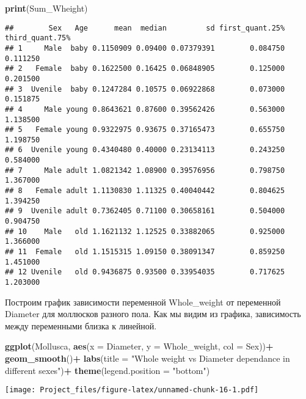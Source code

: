 \documentclass[]{article}
\newenvironment{Shaded}{\begin{snugshade}}{\end{snugshade}}
\newcommand{\DataTypeTok}[1]{\textcolor[rgb]{0.13,0.29,0.53}{#1}}
\newcommand{\KeywordTok}[1]{\textcolor[rgb]{0.13,0.29,0.53}{\textbf{#1}}}
\newcommand{\NormalTok}[1]{#1}
\newcommand{\OperatorTok}[1]{\textcolor[rgb]{0.81,0.36,0.00}{\textbf{#1}}}
\newcommand{\StringTok}[1]{\textcolor[rgb]{0.31,0.60,0.02}{#1}}
\begin{document}
\begin{Shaded}
\begin{Highlighting}[]
\KeywordTok{print}\NormalTok{(Sum_Wheight)}
\end{Highlighting}
\end{Shaded}

\begin{verbatim}
##        Sex   Age      mean  median         sd first_quant.25% third_quant.75%
## 1     Male  baby 0.1150909 0.09400 0.07379391        0.084750        0.111250
## 2   Female  baby 0.1622500 0.16425 0.06848905        0.125000        0.201500
## 3  Uvenile  baby 0.1247284 0.10575 0.06922868        0.073000        0.151875
## 4     Male young 0.8643621 0.87600 0.39562426        0.563000        1.138500
## 5   Female young 0.9322975 0.93675 0.37165473        0.655750        1.198750
## 6  Uvenile young 0.4340480 0.40000 0.23134113        0.243250        0.584000
## 7     Male adult 1.0821342 1.08900 0.39576956        0.798750        1.367000
## 8   Female adult 1.1130830 1.11325 0.40040442        0.804625        1.394250
## 9  Uvenile adult 0.7362405 0.71100 0.30658161        0.504000        0.904750
## 10    Male   old 1.1621132 1.12525 0.33882065        0.925000        1.366000
## 11  Female   old 1.1515315 1.09150 0.38091347        0.859250        1.451000
## 12 Uvenile   old 0.9436875 0.93500 0.33954035        0.717625        1.203000
\end{verbatim}

Построим график зависимости переменной Whole\_weight от переменной
Diameter для моллюсков разного пола. Как мы видим из графика,
зависимость между переменными близка к линейной.

\begin{Shaded}
\begin{Highlighting}[]
\KeywordTok{ggplot}\NormalTok{(Mollusca, }\KeywordTok{aes}\NormalTok{(}\DataTypeTok{x =}\NormalTok{ Diameter, }\DataTypeTok{y =}\NormalTok{ Whole_weight, }\DataTypeTok{col =}\NormalTok{ Sex))}\OperatorTok{+}
\StringTok{  }\KeywordTok{geom_smooth}\NormalTok{()}\OperatorTok{+}
\StringTok{  }\KeywordTok{labs}\NormalTok{(}\DataTypeTok{title =} \StringTok{"Whole weight vs Diameter dependance in different sexes"}\NormalTok{)}\OperatorTok{+}
\StringTok{  }\KeywordTok{theme}\NormalTok{(}\DataTypeTok{legend.position =} \StringTok{"bottom"}\NormalTok{)}
\end{Highlighting}
\end{Shaded}

\texttt{[image: Project\_files/figure-latex/unnamed-chunk-16-1.pdf]}
\end{document}
